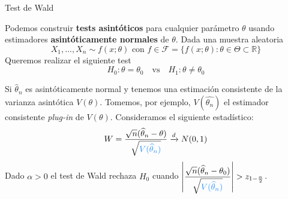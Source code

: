 \documentclass{beamer}
\theoremstyle{definition}
\begin{document}


\begin{frame}{\color{rosee}Test de Wald}\small

 Podemos construir \textbf{tests
    asint\'oticos} para cualquier par\'ametro $\theta$ usando estimadores \textbf{asintóticamente normales} de $\theta$. Dada una muestra aleatoria
    \[X_1, \dots, X_n \sim f(x;\theta) \text{ con } f \in \mathcal{F} = \{f(x;\theta): \theta \in \Theta \subset
      \mathbb{R}\}\] Queremos realizar el siguiente test
    \[H_0:\theta = \theta_0 \quad\text{vs}\quad H_1: \theta \neq
      \theta_0 \]%
    
    Si $\widehat{\theta}_n$ es asint\'oticamente normal y tenemos una
    estimaci\'on consistente de la varianza asint\'otica
    $V(\theta)$. Tomemos, por ejemplo, $V(\widehat{\theta_n})$ el estimador consistente \textit{plug-in} de $V(\theta)$. Consideramos el siguiente estadístico:
    \[W= \dfrac{\sqrt{n}(\widehat{\theta}_n-\theta)}{\sqrt{{\color{dodgerblue}V(\widehat{\theta}_n)}}}\xrightarrow{d}
      N(0,1)\] Dado $\alpha >0$ el test de Wald rechaza
    $H_0$ cuando $\left|\dfrac{\sqrt{n}(\widehat{\theta}_n-\theta_0)}{\sqrt{{\color{dodgerblue}V(\widehat{\theta}_n)}}}\right| > z_{1-\frac{\alpha}{2}}$. 
  
\end{frame}
  
\end{document}
